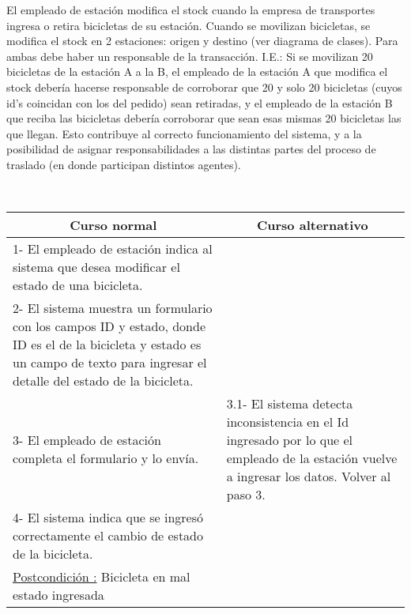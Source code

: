 El empleado de estación modifica el stock cuando la empresa de transportes ingresa o retira bicicletas de su estación.
Cuando se movilizan bicicletas, se modifica el stock en 2 estaciones: origen y destino (ver diagrama de clases). Para ambas
debe haber un responsable de la transacción. I.E.: Si se movilizan 20 bicicletas de la estación A a la B, el empleado de 
la estación A que modifica el stock debería hacerse responsable de corroborar que 20 y solo 20 bicicletas
(cuyos id's coincidan con los del pedido) sean retiradas, y el empleado de la estación B que reciba las bicicletas debería
corroborar que sean esas mismas 20 bicicletas las que llegan. Esto contribuye al correcto funcionamiento del sistema, y a la 
posibilidad de asignar responsabilidades a las distintas partes del proceso de traslado (en donde participan distintos agentes).

~

\begin{center}
    \centering
    \begin{tabular}{ | p{11cm} | p{6cm} | }
    	\multicolumn{1}{c}{\cellcolor{black!30}\textbf{Curso normal}} & 
    	\multicolumn{1}{c}{\cellcolor{black!30}\textbf{Curso alternativo}} \\
		\hline
		1- El empleado de estación indica al sistema que desea modificar el estado de una bicicleta. & \\ \hline
		2- El sistema muestra un formulario con los campos ID y estado, donde ID es el de la bicicleta y estado es un campo de texto para ingresar el detalle del estado de la bicicleta. & \\ \hline
		3- El empleado de estación completa el formulario y lo envía. &
		3.1- El sistema detecta inconsistencia en el Id ingresado por lo que el empleado de la estación vuelve a ingresar los datos. Volver al paso 3. \\ \hline
		4- El sistema indica que se ingresó correctamente el cambio de estado de la bicicleta. & \\ \hline
		\underline{Postcondición :} Bicicleta en mal estado ingresada & \\ \hline
    \end{tabular}
\end{center}

~

